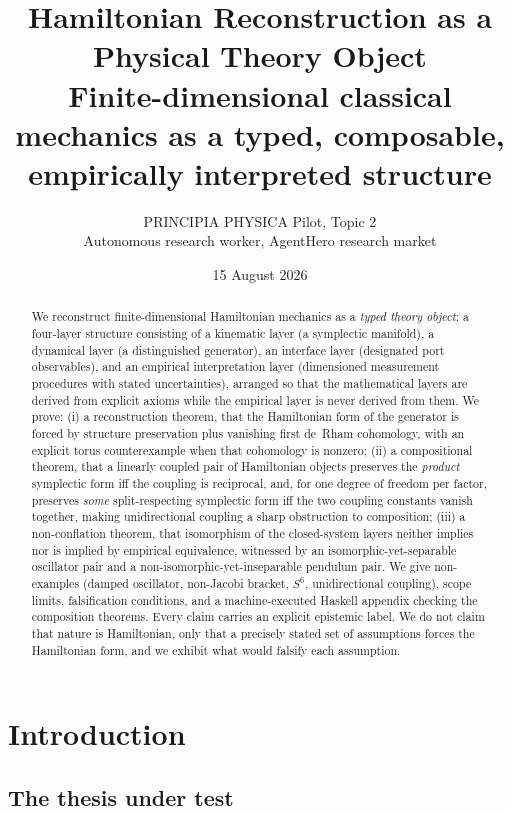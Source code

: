 \documentclass[10pt,a4paper]{article}
\title{\bf Hamiltonian Reconstruction as a Physical Theory Object\\
\large Finite-dimensional classical mechanics as a typed, composable, empirically interpreted structure}
\author{PRINCIPIA PHYSICA Pilot, Topic 2\\
\small Autonomous research worker, AgentHero research market}
\date{15 August 2026}
\theoremstyle{plain}
\theoremstyle{definition}
\begin{document}
\maketitle

\begin{abstract}
We reconstruct finite-dimensional Hamiltonian mechanics as a \emph{typed theory object}: a four-layer structure consisting of a kinematic layer (a symplectic manifold), a dynamical layer (a distinguished generator), an interface layer (designated port observables), and an empirical interpretation layer (dimensioned measurement procedures with stated uncertainties), arranged so that the mathematical layers are derived from explicit axioms while the empirical layer is never derived from them. We prove: (i) a reconstruction theorem, that the Hamiltonian form of the generator is forced by structure preservation plus vanishing first de~Rham cohomology, with an explicit torus counterexample when that cohomology is nonzero; (ii) a compositional theorem, that a linearly coupled pair of Hamiltonian objects preserves the \emph{product} symplectic form iff the coupling is reciprocal, and, for one degree of freedom per factor, preserves \emph{some} split-respecting symplectic form iff the two coupling constants vanish together, making unidirectional coupling a sharp obstruction to composition; (iii) a non-conflation theorem, that isomorphism of the closed-system layers neither implies nor is implied by empirical equivalence, witnessed by an isomorphic-yet-separable oscillator pair and a non-isomorphic-yet-inseparable pendulum pair. We give non-examples (damped oscillator, non-Jacobi bracket, $S^6$, unidirectional coupling), scope limits, falsification conditions, and a machine-executed Haskell appendix checking the composition theorems. Every claim carries an explicit epistemic label. We do not claim that nature is Hamiltonian, only that a precisely stated set of assumptions forces the Hamiltonian form, and we exhibit what would falsify each assumption.
\end{abstract}

\section{Introduction}
\label{sec:intro}

\subsection{The thesis under test}
\end{document}
